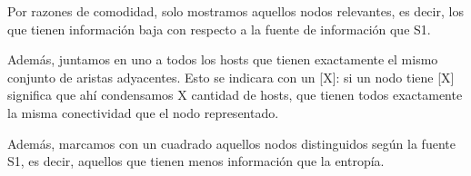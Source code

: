 Por razones de comodidad, solo mostramos aquellos nodos relevantes, es decir, los que tienen información baja con respecto a la fuente de información que S1.

Además, juntamos en uno a todos los hosts que tienen exactamente el mismo conjunto de aristas adyacentes. Esto se indicara con un [X]: si un nodo tiene [X] significa que ahí condensamos X cantidad de hosts, que tienen todos exactamente la misma conectividad que el nodo representado. 

Además, marcamos con un cuadrado aquellos nodos distinguidos según la fuente S1, es decir, aquellos que tienen menos información que la entropía.
